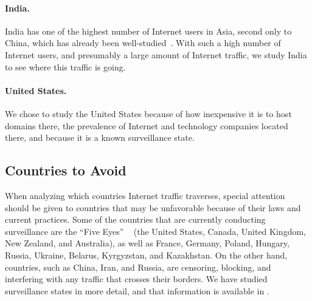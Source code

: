 \paragraph{India.}  India has one of the highest number of Internet users in Asia, second only to China, which has already been well-studied~\cite{tsui2003panopticon, wang2010discourse}.  With such a high number of Internet users, and presumably a large amount of Internet traffic, we study India to see where this traffic is going.

\paragraph{United States.}  We chose to study the United States because of how inexpensive it is to host domains there, the prevalence of Internet and technology companies located there, and because it is a known surveillance state.

\subsection{Countries to Avoid}

When analyzing which countries Internet traffic traverses, special attention should be given to countries that may be unfavorable because of their laws and current practices.  Some of the countries that are currently conducting surveillance are the ``Five Eyes'' ~\cite{lander2004international, eyeswideopen} (the United States, Canada, United Kingdom, New Zealand, and Australia), as well as France, Germany, Poland, Hungary, Russia, Ukraine, Belarus, Kyrgyzstan, and Kazakhstan.  On the other hand, countries, such as China, Iran, and Russia, are censoring, blocking, and interfering with any traffic that crosses their borders.  We have studied surveillance states in more detail, and that information is available in \cite{??}.


